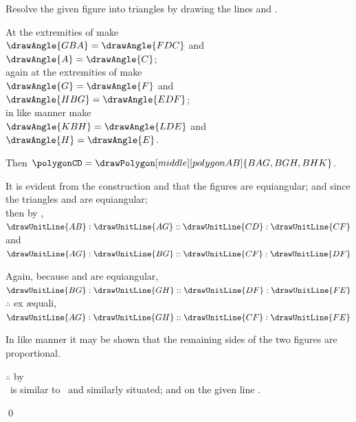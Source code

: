 \documentclass[booklanguage=english]{byrnebook}
\begin{document}
\begin{center}
Resolve the given figure into triangles by drawing the lines  and .

At the extremities of  make\\
$\drawAngle{GBA} = \drawAngle{FDC}$ and $\drawAngle{A} = \drawAngle{C}$;\\
again at the extremities of  make\\
$\drawAngle{G} = \drawAngle{F}$ and $\drawAngle{HBG} = \drawAngle{EDF}$;\\
in like manner make\\
$\drawAngle{KBH} = \drawAngle{LDE}$ and $\drawAngle{H} = \drawAngle{E}$.

Then $\polygonCD = \drawPolygon[middle][polygonAB]{BAG,BGH,BHK}$.

It is evident from the construction and  that the figures are equiangular; and since the triangles  and  are equiangular;\\
then by ,
$\drawUnitLine{AB}:\drawUnitLine{AG} :: \drawUnitLine{CD} : \drawUnitLine{CF}$\\
and $\drawUnitLine{AG}:\drawUnitLine{BG} :: \drawUnitLine{CF} : \drawUnitLine{DF}$

Again, because  and  are equiangular,\\
$\drawUnitLine{BG}:\drawUnitLine{GH} :: \drawUnitLine{DF} : \drawUnitLine{FE}$\\
$\therefore$ ex æquali,\\
$\drawUnitLine{AG}:\drawUnitLine{GH} :: \drawUnitLine{CF} : \drawUnitLine{FE}$  %

In like manner it may be shown that the remaining sides of the two figures are proportional.

$\therefore$ by \\
\polygonAB\ is similar to \polygonCD\ and similarly situated; and on the given line .
\end{center}

\qed
\end{document}
